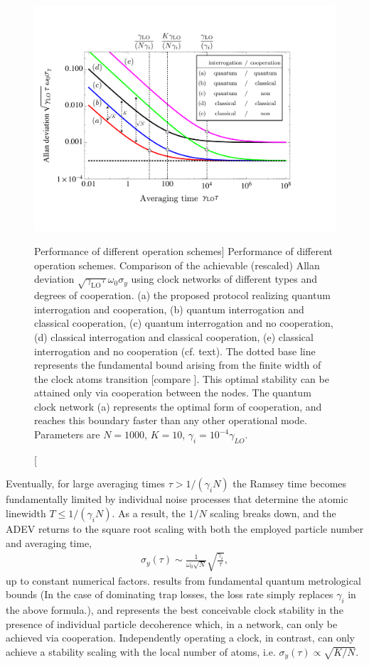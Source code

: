 \begin{figure}
\centering
\includegraphics[width=1\textwidth]{./figs_Komar2014/fig3.pdf}
\caption
[Performance of different operation schemes]
{
\label{fig:comp}
Performance of different operation schemes. Comparison of
the achievable (rescaled) Allan deviation $\sqrt{\gamma_\mathrm{LO} \tau} \omega_0 \sigma_y$ using clock networks of different types and degrees of
cooperation. (a) the proposed protocol realizing quantum interrogation and
cooperation, (b) quantum interrogation and classical cooperation, (c) quantum
interrogation and no cooperation, (d) classical interrogation and classical
cooperation, (e) classical interrogation and no cooperation (cf. text). The
dotted base line represents the fundamental bound arising from the finite width
of the clock atoms transition
[compare ]. This optimal stability can be attained only via cooperation between the
nodes.
The quantum clock network (a) represents the optimal form of cooperation, and reaches this boundary faster than any other
operational mode. Parameters are $N=1000$, $K=10$, $\gamma_i=10^{-4}\gamma_{LO}$.
 }
\end{figure}



Eventually, for large averaging times $\tau > 1/(\gamma_i N)$ the
Ramsey time becomes fundamentally limited by individual
noise processes that determine the atomic linewidth $T\leq 1/(\gamma_i N)$.
As a result, the $1/N$ scaling breaks down, and the ADEV returns to the square
root scaling with both the employed particle number and averaging time,
\begin{align}
\label{eq:ADEV2}
	\sigma_y(\tau) \sim \frac{ 1}{\omega_0 \sqrt N}
	\sqrt{\frac{\gamma_i}{\tau}},
\end{align}
up to constant numerical factors.   results from fundamental
quantum metrological bounds \cite{Escher:2011fn} (In the case of
dominating trap losses, the loss rate simply replaces $\gamma_i$ in the above
formula.), and represents the best conceivable clock stability in the presence
of individual particle decoherence which, in a network, can only be achieved via cooperation. Independently operating a clock, in contrast, can only achieve a stability scaling with the local number of atoms, i.e. $\sigma_y(\tau)\propto \sqrt{K/N}$.


